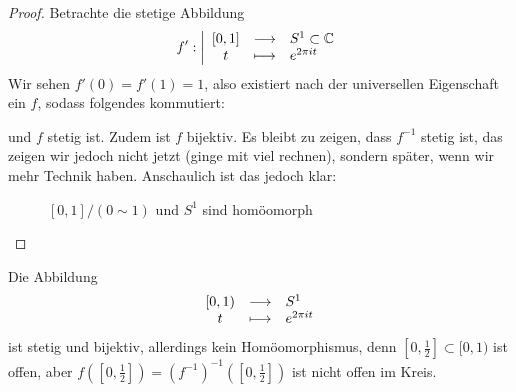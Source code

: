 \begin{proof}
    Betrachte die stetige Abbildung
        \begin{equation*}
        f': \left| \begin{array}{c c l} 
            [0,1] & \longrightarrow & S^1\subset \mathbb{C} \\
        t & \longmapsto &  e^{2\pi it}
        \end{array} \right.
    \end{equation*}
    Wir sehen $f'(0) = f'(1) = 1$, also existiert nach der universellen Eigenschaft ein  $f$, sodass folgendes kommutiert: \\
    und $f$ stetig ist. Zudem ist  $f$ bijektiv. Es bleibt zu zeigen, dass  $f^{-1}$ stetig ist, das zeigen wir jedoch nicht jetzt (ginge mit viel rechnen), sondern später, wenn wir mehr Technik haben. Anschaulich ist das jedoch klar:
\begin{figure}[ht]
    \centering
    \caption{$[0,1] / (0\sim 1)$ und $S^1$ sind homöomorph}
    \label{fig:intervall-und-kreis-sind-homeomorph}
\end{figure}
\end{proof}
\begin{remark}
    Die Abbildung
        \begin{equation*}
        \begin{array}{c c l} 
            [0,1) & \longrightarrow & S^1 \\
        t & \longmapsto &  e^{2\pi it}
        \end{array}
    \end{equation*}
    ist stetig und bijektiv, allerdings kein Homöomorphismus, denn $\left[ 0, \frac{1}{2} \right] \subset [0,1)$ ist offen, aber $f(\left[ 0,\frac{1}{2} \right] ) = \left( f^{-1} \right) ^{-1}\left( \left[ 0,\frac{1}{2} \right]  \right) $ ist nicht offen im Kreis.
\end{remark}

